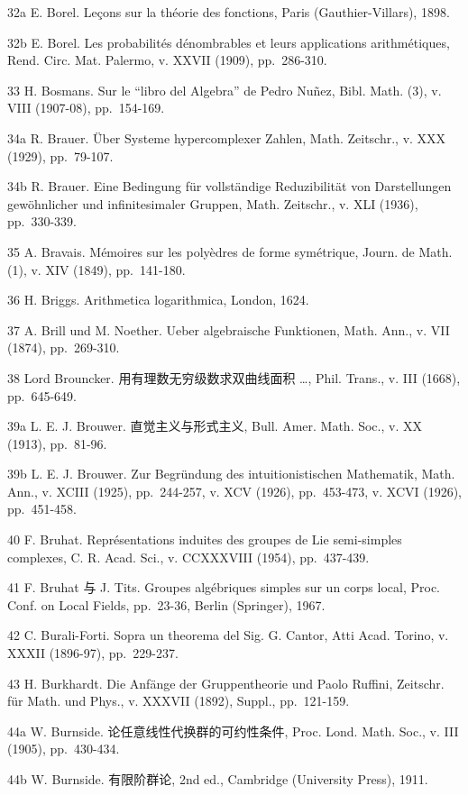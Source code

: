 32a E. Borel. Leçons sur la théorie des fonctions, Paris (Gauthier-Villars), 1898.

32b E. Borel. Les probabilités dénombrables et leurs applications arithmétiques, Rend. Circ. Mat. Palermo, v. XXVII (1909), pp.~286-310.

33 H. Bosmans. Sur le ``libro del Algebra'' de Pedro Nuñez, Bibl. Math. (3), v. VIII (1907-08), pp.~154-169.

34a R. Brauer. Über Systeme hypercomplexer Zahlen, Math. Zeitschr., v. XXX (1929), pp.~79-107.

34b R. Brauer. Eine Bedingung für vollständige Reduzibilität von Darstellungen gewöhnlicher und infinitesimaler Gruppen, Math. Zeitschr., v. XLI (1936), pp.~330-339.

35 A. Bravais. Mémoires sur les polyèdres de forme symétrique, Journ. de Math. (1), v. XIV (1849), pp.~141-180.

36 H. Briggs. Arithmetica logarithmica, London, 1624.

37 A. Brill und M. Noether. Ueber algebraische Funktionen, Math. Ann., v. VII (1874), pp.~269-310.

38 Lord Brouncker. 用有理数无穷级数求双曲线面积 \ldots, Phil. Trans., v. III (1668), pp.~645-649.

39a L. E. J. Brouwer. 直觉主义与形式主义, Bull. Amer. Math. Soc., v. XX (1913), pp.~81-96.

39b L. E. J. Brouwer. Zur Begründung des intuitionistischen Mathematik, Math. Ann., v. XCIII (1925), pp.~244-257, v. XCV (1926), pp.~453-473, v. XCVI (1926), pp.~451-458.

40 F. Bruhat. Représentations induites des groupes de Lie semi-simples complexes, C. R. Acad. Sci., v. CCXXXVIII (1954), pp.~437-439.

41 F. Bruhat 与 J. Tits. Groupes algébriques simples sur un corps local, Proc. Conf. on Local Fields, pp.~23-36, Berlin (Springer), 1967.

42 C. Burali-Forti. Sopra un theorema del Sig. G. Cantor, Atti Acad. Torino, v. XXXII (1896-97), pp.~229-237.

43 H. Burkhardt. Die Anfänge der Gruppentheorie und Paolo Ruffini, Zeitschr. für Math. und Phys., v. XXXVII (1892), Suppl., pp.~121-159.

44a W. Burnside. 论任意线性代换群的可约性条件, Proc. Lond. Math. Soc., v. III (1905), pp.~430-434.

44b W. Burnside. 有限阶群论, 2nd ed., Cambridge (University Press), 1911.

